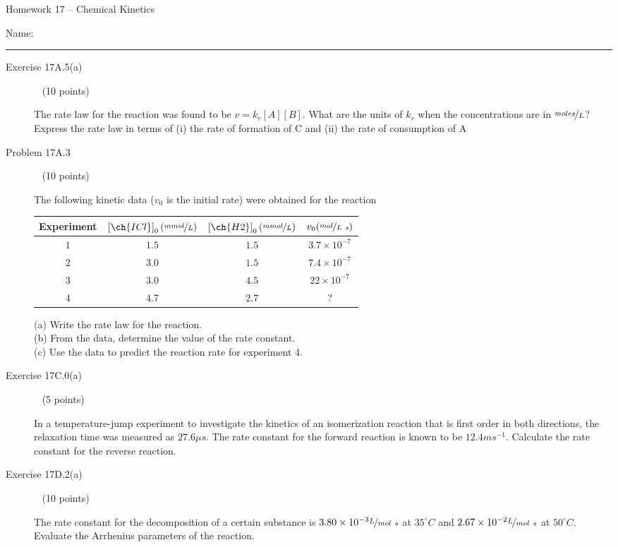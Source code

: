 \documentclass[12pt, openany, letterpaper]{memoir}
\begin{document}
\begin{center}
	{\large Homework 17 -- Chemical Kinetics}
\end{center}

Name: \rule[-.1mm]{15em}{0.1pt}

\begin{description}	
	\item [Exercise 17A.5(a)] ~ (10 points)
	
	The rate law for the reaction  was found to be $v=k_r[A][B]$. What are the units of $k_r$ when the concentrations are in $\nicefrac{moles}{L}$? Express the rate law in terms of (i) the rate of formation of C and (ii) the rate of consumption of A
	
	\vspace{10em}
	\item [Problem 17A.3] ~ (10 points)
	
	
	The following kinetic data ($v_0$ is the initial rate) were obtained for the reaction \\
	
	\begin{tabular}{cccc}
		Experiment & $\left[\ch{ICl}\right]_0 (\nicefrac{mmol}{L})$ & $\left[\ch{H2}\right]_0 (\nicefrac{mmol}{L})$ & $v_0 (\nicefrac{mol}{L~s})$ \\ \midrule
		$1$ & $1.5$ & $1.5$ & $3.7\times10^{-7}$\\
		$2$ & $3.0$ & $1.5$ & $7.4\times10^{-7}$\\
		$3$ & $3.0$ & $4.5$ & $22\times10^{-7}$\\
		$4$ & $4.7$ & $2.7$ & ?\\
	\end{tabular}
	
	(a) Write the rate law for the reaction. \\
	(b) From the data, determine the value of the rate constant. \\
	(c) Use the data to predict the reaction rate for experiment 4.
	
	\vspace{18em}
	\item [Exercise 17C.0(a)] ~ (5 points)
	
	In a temperature-jump experiment to investigate the kinetics of an isomerization reaction that is first order in both directions, the relaxation time was measured as $27.6\mu s$. The rate constant for the forward reaction is known to be $12.4 ms^{-1}$. Calculate the rate constant for the reverse reaction.
	
	\vspace{6em}
	\item [Exercise 17D.2(a)] ~ (10 points)
	
	The rate constant for the decomposition of a certain substance is $3.80\times10^{-3}\nicefrac{L}{mol~s}$ at $35^\circ C$ and $2.67\times10^{-2}\nicefrac{L}{mol~s}$ at $50^\circ C$. Evaluate the Arrhenius parameters of the reaction.
	
	\vspace{12em}
	\item []

\end{description}
\newpage
\pagestyle{empty}
\addtocounter{page}{-1}
\end{document}
